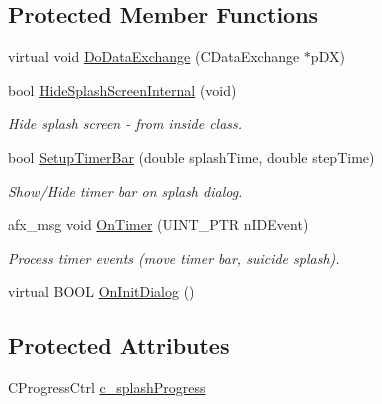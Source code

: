 \subsection*{Protected Member Functions}
\begin{DoxyCompactItemize}
\item 
virtual void \hyperlink{classCSplashDialog_ae212964580361c6c4b7a6ce9f35d56a7}{DoDataExchange} (CDataExchange $\ast$pDX)
\item 
bool \hyperlink{classCSplashDialog_a0362b263b926494b386f18ef1a7c6d89}{HideSplashScreenInternal} (void)
\begin{DoxyCompactList}\small\item\em Hide splash screen -\/ from inside class. \item\end{DoxyCompactList}\item 
bool \hyperlink{classCSplashDialog_a05339035b3f1726a398f6932f4aa7949}{SetupTimerBar} (double splashTime, double stepTime)
\begin{DoxyCompactList}\small\item\em Show/Hide timer bar on splash dialog. \item\end{DoxyCompactList}\item 
afx\_\-msg void \hyperlink{classCSplashDialog_a6d3f618ac91e10727efeb24726d67a23}{OnTimer} (UINT\_\-PTR nIDEvent)
\begin{DoxyCompactList}\small\item\em Process timer events (move timer bar, suicide splash). \item\end{DoxyCompactList}\item 
virtual BOOL \hyperlink{classCSplashDialog_aa2f1d8e47c9ee2093d68927e4f084446}{OnInitDialog} ()
\end{DoxyCompactItemize}
\subsection*{Protected Attributes}
\begin{DoxyCompactItemize}
\item 
CProgressCtrl \hyperlink{classCSplashDialog_ad7450722ad4ee62e87390e01bb15b13e}{c\_\-splashProgress}
\end{DoxyCompactItemize}


